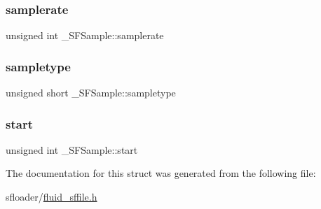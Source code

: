 \subsubsection{\texorpdfstring{samplerate}{samplerate}}
{\footnotesize\ttfamily unsigned int \+\_\+\+S\+F\+Sample\+::samplerate}

\mbox{\label{struct__SFSample_a2bcb91041d5481766c21abfd4b0fe17d}} 
\subsubsection{\texorpdfstring{sampletype}{sampletype}}
{\footnotesize\ttfamily unsigned short \+\_\+\+S\+F\+Sample\+::sampletype}

\mbox{\label{struct__SFSample_a2a482331e1ce21c9cdf682eaf2f11cd8}} 
\subsubsection{\texorpdfstring{start}{start}}
{\footnotesize\ttfamily unsigned int \+\_\+\+S\+F\+Sample\+::start}



The documentation for this struct was generated from the following file\+:\begin{DoxyCompactItemize}
\item 
sfloader/\hyperlink{fluid__sffile_8h}{fluid\+\_\+sffile.\+h}\end{DoxyCompactItemize}
